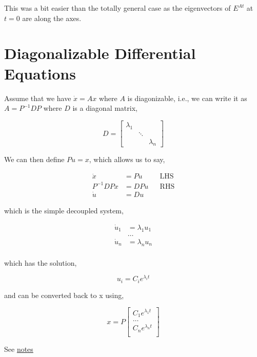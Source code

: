\documentclass{article}
\begin{document}
\noindent This was a bit easier than the totally general case as the eigenvectors of $E^{At}$ at $t = 0$ are along the axes.

\section{Diagonalizable Differential Equations}

Assume that we have $\dot{x} = Ax$ where $A$ is diagonizable, i.e., we can write it as $A = P^{-1}DP$ where $D$ is a diagonal matrix,

\begin{equation}
    D = \begin{bmatrix}
        \lambda_1 & & \\
                  & \ddots{} & \\
                  & & \lambda_n
    \end{bmatrix}
\end{equation}

\noindent We can then define $P u = x$, which allows us to say,

\begin{align}
    \dot{x} &= P \dot{u} &&\text{LHS} \\
    P^{-1}DP x &= DP u  &&\text{RHS} \\
    \dot{u} &= Du &&\text{}
\end{align}

\noindent which is the simple decoupled system,

\begin{align}
    \dot{u}_1 &= \lambda_1 u_1 \\
              & \dots{} \\
    \dot{u}_n &= \lambda_n u_n \\
\end{align}

\noindent which has the solution,

$$
u_i = C_i e^{\lambda_i t}
$$

\noindent and can be converted back to x using,

$$
x = P \begin{bmatrix}
    C_1 e^{\lambda_1 t} \\
    \dots \\
    C_n e^{\lambda_n t} \\
\end{bmatrix}
$$


See \href{http://people.math.gatech.edu/~xchen/teach/ode/HomogSys.pdf}{notes}
\end{document}
